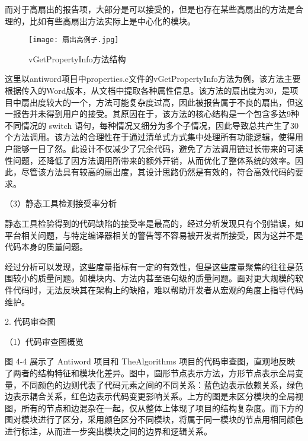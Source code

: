 而对于高扇出的报告项，大部分是可以接受的，但是也存在某些高扇出的方法是合理的，比如有些高扇出方法实际上是中心化的模块。

\begin{figure}[h]
\centering
\texttt{[image: 扇出高例子.jpg]}
\caption{vGetPropertyInfo方法结构}
\end{figure}
    

这里以antiword项目中properties.c文件的vGetPropertyInfo方法为例，该方法主要根据传入的Word版本，从文档中提取各种属性信息。该方法的扇出度为30，是项目中扇出度较大的一个，方法可能复杂度过高，因此被报告属于不良的扇出，但这一报告并未得到用户的接受。其原因在于，该方法的核心结构是一个包含多达9种不同情况的 switch 语句，每种情况又细分为多个子情况，因此导致总共产生了30个方法调用。该方法的合理性在于通过清单式方式集中处理所有功能逻辑，使得用户能够一目了然。此设计不仅减少了冗余代码，避免了方法调用链过长带来的可读性问题，还降低了因方法调用所带来的额外开销，从而优化了整体系统的效率。因此，尽管该方法具有较高的扇出度，其设计思路仍然是有效的，符合高效代码的要求。

（3）静态工具检测接受率分析

静态工具检验得到的代码缺陷的接受率是最高的，经过分析发现只有个别错误，如平台相关问题，与特定编译器相关的警告等不容易被开发者所接受，因为这并不是代码本身的质量问题。


经过分析可以发现，这些度量指标有一定的有效性，但是这些度量聚焦的往往是范围较小的质量问题。如模块内、方法内甚至语句级的质量问题。面对更大规模的软件代码时，无法反映其在架构上的缺陷，难以帮助开发者从宏观的角度上指导代码维护。


2. 代码审查图

（1）代码审查图概览

图 4-4 展示了 Antiword 项目和 TheAlgorithms 项目的代码审查图，直观地反映了两者的结构特征和模块化差异。图中，圆形节点表示方法，方形节点表示全局变量，不同颜色的边则代表了代码元素之间的不同关系：蓝色边表示依赖关系，绿色边表示耦合关系，红色边表示代码变更影响关系。上方的图是未区分模块的全局视图，所有的节点和边混杂在一起，仅从整体上体现了项目的结构复杂度。而下方的图对模块进行了区分，采用颜色区分不同模块，将属于同一模块的节点用相同颜色进行标注，从而进一步突出模块之间的边界和逻辑关系。

